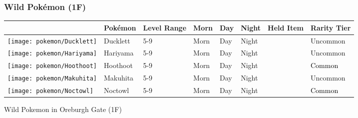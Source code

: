 \subsubsection{Wild Pokémon (1F)}%
\label{ssubsec:WildPokmon(1F)}%
\begin{longtable}{||l l l l l l l l||}%
\hline%
\rowcolor{gray}%
&Pokémon&Level Range&Morn&Day&Night&Held Item&Rarity Tier\\%
\hline%
\endhead%
\hline%
\rowcolor{gray}%
\texttt{[image: pokemon/Ducklett]}&Ducklett&5{-}9&Morn&Day&Night&&\textcolor{OliveGreen}{%
Uncommon%
}\\%
\hline%
\rowcolor{gray}%
\texttt{[image: pokemon/Hariyama]}&Hariyama&5{-}9&Morn&Day&Night&&\textcolor{OliveGreen}{%
Uncommon%
}\\%
\hline%
\rowcolor{gray}%
\texttt{[image: pokemon/Hoothoot]}&Hoothoot&5{-}9&Morn&Day&Night&&\textcolor{black}{%
Common%
}\\%
\hline%
\rowcolor{gray}%
\texttt{[image: pokemon/Makuhita]}&Makuhita&5{-}9&Morn&Day&Night&&\textcolor{OliveGreen}{%
Uncommon%
}\\%
\hline%
\rowcolor{gray}%
\texttt{[image: pokemon/Noctowl]}&Noctowl&5{-}9&Morn&Day&Night&&\textcolor{black}{%
Common%
}\\%
\hline%
\end{longtable}%
\caption{Wild Pokemon in Oreburgh Gate (1F)}